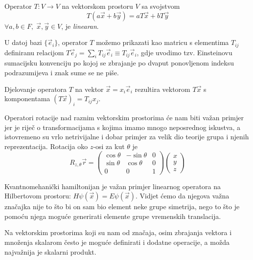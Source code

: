 \begin{definicija}
Operator $T:V \to V$ na vektorskom prostoru $V$
sa svojstvom
\begin{displaymath}
   T(a \vec{x} + b \vec{y} ) = a T\vec{x} + b T\vec{y} 
\end{displaymath}
 $\forall a,b\in F,\; \vec{x}, \vec{y} \in V$, je \emph{linearan}.
\end{definicija}

U datoj bazi $\{\vec{e}_{i}\}$, operator $T$ možemo prikazati
kao matricu s elementima $T_{ij}$ definiranu relacijom
$ T\vec{e}_j = \sum_{i} T_{ij} \vec{e}_i \equiv T_{ij} \vec{e}_i$, 
gdje uvodimo tzv. Einsteinovu sumacijsku konvenciju po kojoj se
zbrajanje po dvaput ponovljenom indeksu podrazumijeva i znak
sume se ne piše.

Djelovanje operatora $T$ na vektor $\vec{x}=x_i \vec{e}_i$ rezultira
vektorom $T\vec{x}$  s komponentama $(T \vec{x})_i = T_{ij} x_j$.

\begin{primjer}
Operatori rotacije nad raznim vektorskim prostorima će nam biti važan primjer jer
je riječ o transformacijama s kojima imamo mnogo neposrednog iskustva,
a istovremeno su vrlo netrivijalne i dobar primjer za velik dio
teorije grupa i njenih reprezentacija.
Rotacija oko $z$-osi za kut $\theta$ je
\begin{equation*}
R_{z,\theta}\vec{r}=
\begin{pmatrix}
\cos\theta & -\sin\theta & 0 \\
\sin\theta & \cos\theta & 0 \\
 0 & 0 & 1
\end{pmatrix} 
\begin{pmatrix}
x \\ y \\ z
\end{pmatrix}
\end{equation*}
\end{primjer}

\begin{primjer}[Hamiltonijan]
Kvantnomehanički hamiltonijan je važan primjer linearnog operatora
na Hilbertovom prostoru: $H \psi(\vec{x}) = E \psi(\vec{x}) $.
Vidjet ćemo da njegova važna značajka nije to što bi on sam bio element neke
grupe simetrija, nego to što je pomoću njega moguće generirati
elemente grupe vremenskih translacija.
\end{primjer}

Na vektorskim prostorima koji su nam od značaja, osim zbrajanja vektora i
množenja skalarom često je moguće definirati i dodatne operacije, a
možda najvažnija je skalarni produkt.

